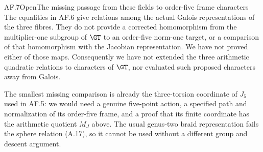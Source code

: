 \begin{statement}{AF.7}{Open}{The missing passage from these fields to order-five frame characters}
The equalities in AF.6 give relations among the actual Galois
representations of the three fibres. They do not provide a
corrected homomorphism from the multiplier-one subgroup of
$\GT$ to an order-five norm-one target, or a comparison of that
homomorphism with the Jacobian representation. We have not
proved either of those maps. Consequently we have not extended
the three arithmetic quadratic relations to characters of
$\GT$, nor evaluated such proposed characters away from Galois.
\end{statement}
The smallest missing comparison is already the three-torsion
coordinate of $J_5$ used in AF.5: we would need a genuine
five-point action, a specified path and normalization of its
order-five frame, and a proof that its finite coordinate has
the arithmetic quotient $M_J$ above. The usual genus-two braid
representation fails the sphere relation (A.17), so it cannot
be used without a different group and descent argument.

